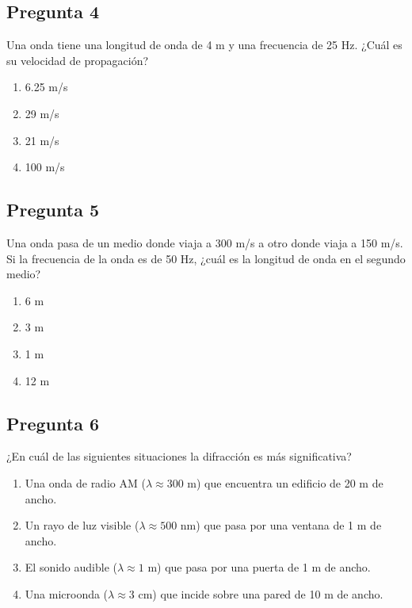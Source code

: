 \begin{preguntabox}
\subsection*{Pregunta 4}
Una onda tiene una longitud de onda de 4 m y una frecuencia de 25 Hz. ¿Cuál es su velocidad de propagación?

\begin{enumerate}
    \item[A)] 6.25 m/s
    \item[B)] 29 m/s
    \item[C)] 21 m/s
    \item[D)] 100 m/s
\end{enumerate}
\end{preguntabox}

\begin{preguntabox}
\subsection*{Pregunta 5}
Una onda pasa de un medio donde viaja a 300 m/s a otro donde viaja a 150 m/s. Si la frecuencia de la onda es de 50 Hz, ¿cuál es la longitud de onda en el segundo medio?

\begin{enumerate}
    \item[A)] 6 m
    \item[B)] 3 m
    \item[C)] 1 m
    \item[D)] 12 m
\end{enumerate}
\end{preguntabox}

\begin{preguntabox}
\subsection*{Pregunta 6}
¿En cuál de las siguientes situaciones la difracción es más significativa?

\begin{enumerate}
    \item[A)] Una onda de radio AM ($\lambda \approx 300$ m) que encuentra un edificio de 20 m de ancho.
    \item[B)] Un rayo de luz visible ($\lambda \approx 500$ nm) que pasa por una ventana de 1 m de ancho.
    \item[C)] El sonido audible ($\lambda \approx 1$ m) que pasa por una puerta de 1 m de ancho.
    \item[D)] Una microonda ($\lambda \approx 3$ cm) que incide sobre una pared de 10 m de ancho.
\end{enumerate}
\end{preguntabox}


